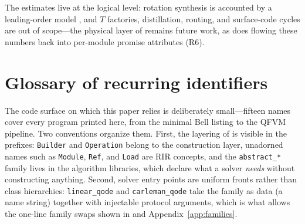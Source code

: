 The estimates live at the logical level: rotation synthesis is accounted by
a leading-order model \cite{ross2016optimal}, and $T$ factories,
distillation, routing, and surface-code cycles are out of scope---the
physical layer of \cite{beverland2022assessing,gidney2025rsa} remains
future work, as does flowing these numbers back into per-module promise
attributes (R6).


\section{Glossary of recurring identifiers}
\label{app:glossary}

The code surface on which this paper relies is deliberately small---fifteen
names cover every program printed here, from the minimal Bell listing to
the QFVM pipeline.  Two conventions organize them.  First, the layering of
 is visible in the prefixes: \texttt{Builder} and
\texttt{Operation} belong to the construction layer, unadorned names such
as \texttt{Module}, \texttt{Ref}, and \texttt{Load} are RIR concepts, and
the \texttt{abstract\_*} family lives in the algorithm libraries, which
declare what a solver \emph{needs} without constructing anything.
Second, solver entry points are uniform fronts rather than class
hierarchies: \texttt{linear\_qode} and \texttt{carleman\_qode} take the
family as data (a name string) together with injectable protocol
arguments, which is what allows the one-line family swaps shown in
 and Appendix~\ref{app:families}.

